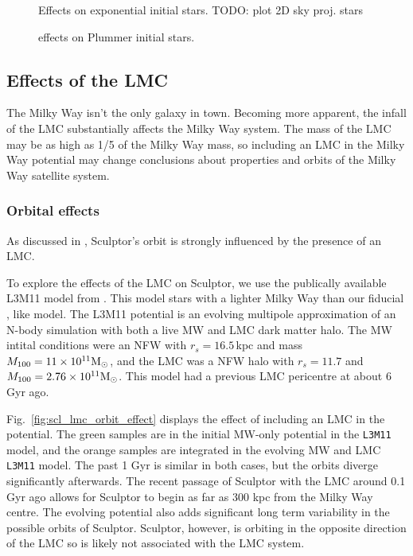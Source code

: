 \begin{figure}
\centering
{}
\caption[Sculptor initial and final density profiles]{Effects on
exponential initial stars. TODO: plot 2D sky proj.
stars}\label{fig:scl_smallperi_i_f}
\end{figure}

\begin{figure}
\centering
{}
\caption[Sculptor Plummer initial and final density profiles]{effects on
Plummer initial stars.}\label{fig:scl_smallperi_plummer_i_f}
\end{figure}

\subsection{Effects of the LMC}\label{effects-of-the-lmc}

The Milky Way isn't the only galaxy in town. Becoming more apparent, the
infall of the LMC substantially affects the Milky Way system. The mass
of the LMC may be as high as 1/5 of the Milky Way mass, so including an
LMC in the Milky Way potential may change conclusions about properties
and orbits of the Milky Way satellite system.

\subsubsection{Orbital effects}\label{orbital-effects}

As discussed in \citet{battaglia+2022}, Sculptor's orbit is strongly
influenced by the presence of an LMC.

To explore the effects of the LMC on Sculptor, we use the publically
available L3M11 model from \citet{vasiliev2024}. This model stars with a
lighter Milky Way than our fiducial \citet{EP2020}, \citet{mcmillan2011}
like model. The L3M11 potential is an evolving multipole approximation
of an N-body simulation with both a live MW and LMC dark matter halo.
The MW intital conditions were an NFW with \(r_s=16.5\,\)kpc and mass
\(M_{\rm 100}= 11\times10^{11}{\rm M}_{\odot}\), and the LMC was a NFW halo with
\(r_s=11.7\) and \(M_{100} = 2.76 \times 10^{11} {\rm M}_{\odot}\). This model had a
previous LMC pericentre at about 6 Gyr ago.

Fig.~\ref{fig:scl_lmc_orbit_effect} displays the effect of including an
LMC in the potential. The green samples are in the initial MW-only
potential in the \texttt{L3M11} model, and the orange samples are
integrated in the evolving MW and LMC \texttt{L3M11} model. The past 1
Gyr is similar in both cases, but the orbits diverge significantly
afterwards. The recent passage of Sculptor with the LMC around 0.1 Gyr
ago allows for Sculptor to begin as far as 300 kpc from the Milky Way
centre. The evolving potential also adds significant long term
variability in the possible orbits of Sculptor. Sculptor, however, is
orbiting in the opposite direction of the LMC so is likely not
associated with the LMC system.

